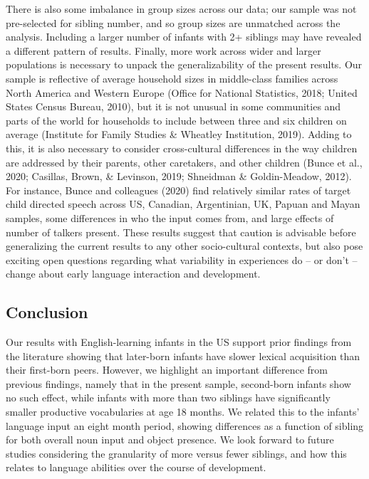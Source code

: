 \documentclass[
  english,
  man,floatsintext]{apa6}
\begin{document}
There is also some imbalance in group sizes across our data; our sample was not pre-selected for sibling number, and so group sizes are unmatched across the analysis. Including a larger number of infants with 2+ siblings may have revealed a different pattern of results. Finally, more work across wider and larger populations is necessary to unpack the generalizability of the present results. Our sample is reflective of average household sizes in middle-class families across North America and Western Europe (Office for National Statistics, 2018; United States Census Bureau, 2010), but it is not unusual in some communities and parts of the world for households to include between three and six children on average (Institute for Family Studies \& Wheatley Institution, 2019). Adding to this, it is also necessary to consider cross-cultural differences in the way children are addressed by their parents, other caretakers, and other children (Bunce et al., 2020; Casillas, Brown, \& Levinson, 2019; Shneidman \& Goldin-Meadow, 2012). For instance, Bunce and colleagues (2020) find relatively similar rates of target child directed speech across US, Canadian, Argentinian, UK, Papuan and Mayan samples, some differences in who the input comes from, and large effects of number of talkers present. These results suggest that caution is advisable before generalizing the current results to any other socio-cultural contexts, but also pose exciting open questions regarding what variability in experiences do -- or don't -- change about early language interaction and development.

\hypertarget{conclusion}{%
\subsection{Conclusion}\label{conclusion}}

Our results with English-learning infants in the US support prior findings from the literature showing that later-born infants have slower lexical acquisition than their first-born peers. However, we highlight an important difference from previous findings, namely that in the present sample, second-born infants show no such effect, while infants with more than two siblings have significantly smaller productive vocabularies at age 18 months. We related this to the infants' language input an eight month period, showing differences as a function of sibling for both overall noun input and object presence. We look forward to future studies considering the granularity of more versus fewer siblings, and how this relates to language abilities over the course of development.
\end{document}
